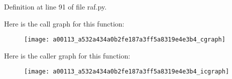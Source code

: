 Definition at line 91 of file raf.\-py.



Here is the call graph for this function\-:
\nopagebreak
\begin{figure}[H]
\begin{center}
\leavevmode
\texttt{[image: a00113\_a532a434a0b2fe187a3ff5a8319e4e3b4\_cgraph]}
\end{center}
\end{figure}




Here is the caller graph for this function\-:
\nopagebreak
\begin{figure}[H]
\begin{center}
\leavevmode
\texttt{[image: a00113\_a532a434a0b2fe187a3ff5a8319e4e3b4\_icgraph]}
\end{center}
\end{figure}


